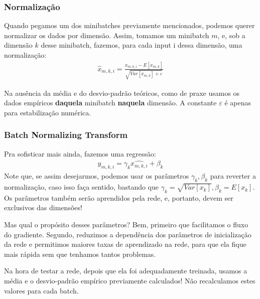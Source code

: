 \documentclass{article}
\begin{document}
\subsubsection{Normalização}
Quando pegamos um dos minibatches previamente mencionados, podemos querer normalizar os dados por dimensão. Assim, tomamos um minibatch $m$, e, sob a dimensão $k$ desse minibatch, fazemos, para cada input i dessa dimensão, uma normalização:
\begin{gather*}
   \hat{x}_{m, k,i} = \frac{x_{m,k,i} - E[x_{m,k}]}{ \sqrt{Var[x_{m, k}]+\varepsilon}} 
\end{gather*}

Na ausência da média e do desvio-padrão teóricos, como de praxe usamos os dados empíricos \textbf{daquela} minibatch \textbf{naquela} dimensão. A constante $\varepsilon$ é apenas para estabilização numérica. \par
\subsubsection{Batch Normalizing Transform}
Pra sofisticar mais ainda, fazemos uma regressão: 
\begin{gather*}
    y_{m,k,i} = \gamma_k \hat{x_{m,k,i}} + \beta_k
\end{gather*}
Note que, se assim desejarmos, podemos usar os parâmetros $\gamma_k, \beta_k$ para reverter a normalização, caso isso faça sentido, bastando que $\gamma_k = \sqrt{Var[x_k]}, \beta_k = E[x_k]$. Os parâmetros também serão aprendidos pela rede, e, portanto, devem ser exclusivos das dimensões! \par
Mas qual o propósito desses parâmetros? Bem, primeiro que facilitamos o fluxo do gradiente. Segundo, reduzimos a dependência dos parâmetros de inicialização da rede e permitimos maiores taxas de aprendizado na rede, para que ela fique mais rápida sem que tenhamos tantos problemas. \par
Na hora de testar a rede, depois que ela foi adequadamente treinada, usamos a média e o desvio-padrão empírico previamente calculados! Não recalculamos estes valores para cada batch.
\subsection{}
\end{document}

